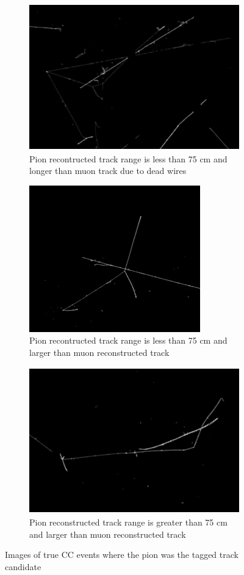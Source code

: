 \begin{figure}[htp!]
\centering
	\begin{subfigure}[b]{.3\textwidth}
	\includegraphics[width=\textwidth,height=2.5in]{figs/interesting_event.png}
	\caption{Pion recontructed track range is less than 75 cm and longer than muon track due to dead wires}
	\label{fig:longer_muon_badreco}
	\end{subfigure}
	\quad
	\begin{subfigure}[b]{.3\textwidth}
	\includegraphics[width=\textwidth,height=2.5in]{figs/event2.png}
	\caption{Pion recontructed track range is less than 75 cm and larger than muon reconstructed track}
	\label{fig:longer_pion}
	\end{subfigure}
	\quad
	\begin{subfigure}[b]{.3\textwidth}
	\includegraphics[width=\textwidth,height=2.5in]{figs/mupievent.png}
	\caption{Pion reconstructed track range is greater than 75 cm and larger than muon reconstructed track}
	\label{fig:verylongpion}
	\end{subfigure}
	\quad
\caption{Images of true CC events where the pion was the tagged track candidate}
\label{fig:evd}
\end{figure}

